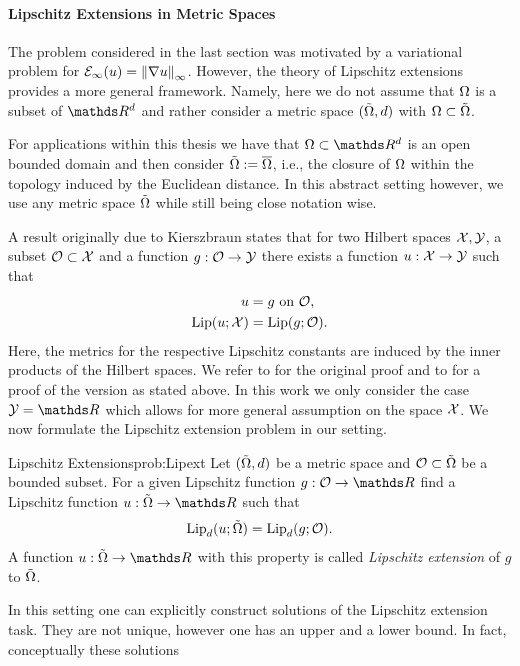 \paragraph{Lipschitz Extensions in Metric Spaces} The problem considered in the last section was motivated by a variational problem for $\mathcal{E}_\infty(u)=\left\|\nabla u\right\|_\infty$. However, the theory of Lipschitz extensions provides a more general framework. Namely, here we do not assume that $\Omega$ is a subset of 
$\R^d$ and rather consider a metric space $(\tilde{\Omega},d)$ with $\Omega\subset \tilde{\Omega}$. 
%
\begin{remark}{}{}
For applications within this thesis we have that $\domain\subset\R^d$ is an open bounded domain and then consider 
$\tilde{\Omega}:= \overline{\Omega}$, i.e., the closure of $\Omega$ within the topology induced by the Euclidean distance. 
In this abstract setting however, we use any metric space $\tilde{\Omega}$ while still being close notation wise.
\end{remark}
%
%
%
\noindent%
A result originally due to Kierszbraun \cite{Kirszbraun1934} states that for two Hilbert spaces $\mathcal{X}, \mathcal{\mathcal{Y}}$, a subset $\mathcal{O}\subset \mathcal{X}$ and a function $g:\mathcal{O}\to \mathcal{\mathcal{Y}}$ there exists a function $u:\mathcal{X}\to \mathcal{\mathcal{Y}}$ such that 
%
\begin{align*}
u &= g \text{ on } \mathcal{O},\\
\operatorname{Lip}(u; \mathcal{X}) &= \operatorname{Lip}(g; \mathcal{O}).
\end{align*}
%
Here, the metrics for the respective Lipschitz constants are induced by the inner products of the Hilbert spaces. We refer to \cite{Kirszbraun1934} for the original proof and to \cite[Th. 1.31]{Schwartz1969} for a proof of the version as stated above.
In this work we only consider the case $\Oup=\R$ which allows for more general assumption on the space $\mathcal{X}$. We now formulate the Lipschitz extension problem in our setting.
%
\begin{problem}{Lipschitz Extensions}{prob:Lipext}
Let $(\tilde{\Omega},d)$ be a metric space and $\mathcal{O}\subset \tilde{\Omega}$ be a bounded subset. For a given Lipschitz function $g:\conset\to\R$ find a Lipschitz function $u:\tilde\domain\to \R$ such that
%
\begin{align*}
\operatorname{Lip}_d(u; \tilde{\Omega}) = \operatorname{Lip}_d(g; \mathcal{O}).
\end{align*}
%
A function $u:\tilde{\domain}\to\R$ with this property is called \emph{Lipschitz extension} of 
$g$ to $\tilde{\Omega}$.
\end{problem}
%
\noindent%
In this setting one can explicitly construct solutions of the Lipschitz extension task. They are not unique, however one has an upper and a lower bound. In fact, conceptually these solutions 
